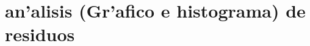 \documentclass[letterpaper,11pt]{report}
\begin{document}
%
%
%

\section{an'alisis (Gr'afico e histograma) de residuos}

\end{document}
